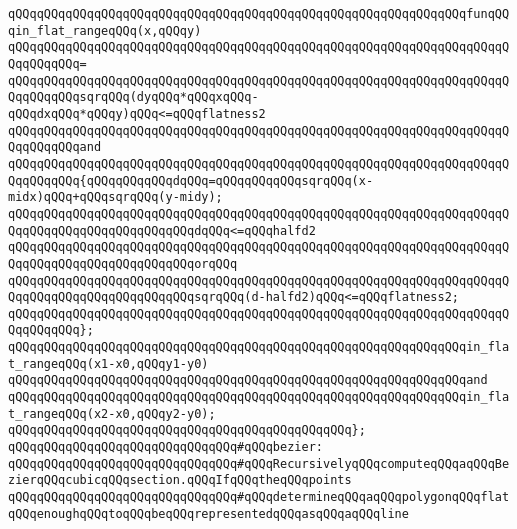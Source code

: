 \newline
\verb|qQQqqQQqqQQqqQQqqQQqqQQqqQQqqQQqqQQqqQQqqQQqqQQqqQQqqQQqqQQqqQQqfunqQQqin_flat_rangeqQQq(x,qQQqy)|\newline
\verb|qQQqqQQqqQQqqQQqqQQqqQQqqQQqqQQqqQQqqQQqqQQqqQQqqQQqqQQqqQQqqQQqqQQqqQQqqQQqqQQq=|\newline
\verb|qQQqqQQqqQQqqQQqqQQqqQQqqQQqqQQqqQQqqQQqqQQqqQQqqQQqqQQqqQQqqQQqqQQqqQQqqQQqqQQqsqrqQQq(dyqQQq*qQQqxqQQq-qQQqdxqQQq*qQQqy)qQQq<=qQQqflatness2|\newline
\verb|qQQqqQQqqQQqqQQqqQQqqQQqqQQqqQQqqQQqqQQqqQQqqQQqqQQqqQQqqQQqqQQqqQQqqQQqqQQqqQQqand|\newline
\verb|qQQqqQQqqQQqqQQqqQQqqQQqqQQqqQQqqQQqqQQqqQQqqQQqqQQqqQQqqQQqqQQqqQQqqQQqqQQqqQQq{qQQqqQQqqQQqdqQQq=qQQqqQQqqQQqsqrqQQq(x-midx)qQQq+qQQqsqrqQQq(y-midy);|\newline
\newline
\verb|qQQqqQQqqQQqqQQqqQQqqQQqqQQqqQQqqQQqqQQqqQQqqQQqqQQqqQQqqQQqqQQqqQQqqQQqqQQqqQQqqQQqqQQqqQQqqQQqdqQQq<=qQQqhalfd2|\newline
\verb|qQQqqQQqqQQqqQQqqQQqqQQqqQQqqQQqqQQqqQQqqQQqqQQqqQQqqQQqqQQqqQQqqQQqqQQqqQQqqQQqqQQqqQQqqQQqqQQqorqQQq|\newline
\verb|qQQqqQQqqQQqqQQqqQQqqQQqqQQqqQQqqQQqqQQqqQQqqQQqqQQqqQQqqQQqqQQqqQQqqQQqqQQqqQQqqQQqqQQqqQQqqQQqsqrqQQq(d-halfd2)qQQq<=qQQqflatness2;|\newline
\verb|qQQqqQQqqQQqqQQqqQQqqQQqqQQqqQQqqQQqqQQqqQQqqQQqqQQqqQQqqQQqqQQqqQQqqQQqqQQqqQQq};|\newline
\newline
\verb|qQQqqQQqqQQqqQQqqQQqqQQqqQQqqQQqqQQqqQQqqQQqqQQqqQQqqQQqqQQqqQQqin_flat_rangeqQQq(x1-x0,qQQqy1-y0)|\newline
\verb|qQQqqQQqqQQqqQQqqQQqqQQqqQQqqQQqqQQqqQQqqQQqqQQqqQQqqQQqqQQqqQQqand|\newline
\verb|qQQqqQQqqQQqqQQqqQQqqQQqqQQqqQQqqQQqqQQqqQQqqQQqqQQqqQQqqQQqqQQqin_flat_rangeqQQq(x2-x0,qQQqy2-y0);|\newline
\verb|qQQqqQQqqQQqqQQqqQQqqQQqqQQqqQQqqQQqqQQqqQQqqQQq};|\newline
\newline
\verb|qQQqqQQqqQQqqQQqqQQqqQQqqQQqqQQq#qQQqbezier:|\newline
\verb|qQQqqQQqqQQqqQQqqQQqqQQqqQQqqQQq#qQQqRecursivelyqQQqcomputeqQQqaqQQqBezierqQQqcubicqQQqsection.qQQqIfqQQqtheqQQqpoints|\newline
\verb|qQQqqQQqqQQqqQQqqQQqqQQqqQQqqQQq#qQQqdetermineqQQqaqQQqpolygonqQQqflatqQQqenoughqQQqtoqQQqbeqQQqrepresentedqQQqasqQQqaqQQqline|\newline
